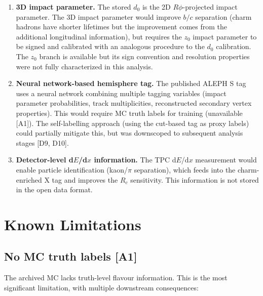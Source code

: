 \documentclass[11pt,a4paper]{article}
\begin{document}
\begin{enumerate}
\item \textbf{3D impact parameter.} The stored $d_0$ is the 2D $R\phi$-projected
impact parameter. The 3D impact parameter would improve $b/c$ separation (charm
hadrons have shorter lifetimes but the improvement comes from the additional
longitudinal information), but requires the $z_0$ impact parameter to be signed and
calibrated with an analogous procedure to the $d_0$ calibration. The $z_0$ branch
is available but its sign convention and resolution properties were not fully
characterized in this analysis.

\item \textbf{Neural network-based hemisphere tag.} The published ALEPH S
tag~\cite{ALEPH:Rb:1996} uses a neural network combining multiple tagging variables
(impact parameter probabilities, track multiplicities, reconstructed secondary vertex
properties). This would require MC truth labels for training (unavailable [A1]). The
self-labelling approach (using the cut-based tag as proxy labels) could partially
mitigate this, but was downscoped to subsequent analysis stages [D9, D10].

\item \textbf{Detector-level d$E$/d$x$ information.} The TPC d$E$/d$x$ measurement
would enable particle identification (kaon/$\pi$ separation), which feeds into the
charm-enriched X tag and improves the $R_c$ sensitivity. This information is not
stored in the open data format.
\end{enumerate}

\FloatBarrier
{}
\section{Known Limitations}
\label{sec:limitations}

\subsection{No MC truth labels [A1]}

The archived MC lacks truth-level flavour information. This is the most significant
limitation, with multiple downstream consequences:
\end{document}

